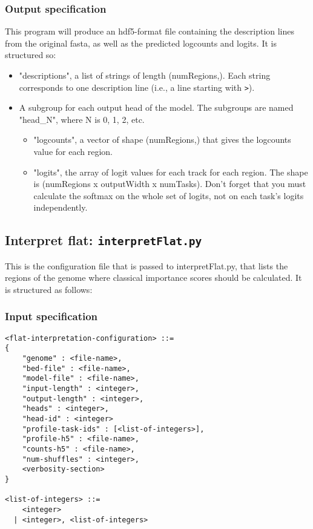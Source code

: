 \documentclass{article}
\begin{document}
\subsubsection{Output specification}

This program will produce an hdf5-format file containing the description lines from the original fasta, as well as the predicted logcounts and logits.
It is structured so:

\begin{itemize}
    \item "descriptions", a list of strings of length (numRegions,). Each string corresponds to one description line (i.e., a line starting with \texttt{>}). 
    \item A subgroup for each output head of the model. The subgroups are named "head\_N", where N is 0, 1, 2, etc. 
        \begin{itemize}
            \item "logcounts", a vector of shape (numRegions,) that gives the logcounts value for each region. 
            \item "logits", the array of logit values for each track for each region. The shape is (numRegions x outputWidth x numTasks). Don't forget that you must calculate the softmax on the whole set of logits, not on each task's logits independently.
        \end{itemize} 
\end{itemize}




\newpage

\subsection{Interpret flat: \texttt{interpretFlat.py}}

This is the configuration file that is passed to interpretFlat.py, that lists the regions of the genome where classical importance scores should be calculated. It is structured as follows:

\subsubsection{Input specification}

\begin{lstlisting}
<flat-interpretation-configuration> ::=
{
    "genome" : <file-name>,
    "bed-file" : <file-name>,
    "model-file" : <file-name>,
    "input-length" : <integer>,
    "output-length" : <integer>,
    "heads" : <integer>,
    "head-id" : <integer>
    "profile-task-ids" : [<list-of-integers>],
    "profile-h5" : <file-name>,
    "counts-h5" : <file-name>,
    "num-shuffles" : <integer>,
    <verbosity-section>
}

<list-of-integers> ::=
    <integer>
  | <integer>, <list-of-integers>

\end{lstlisting}
\end{document}

